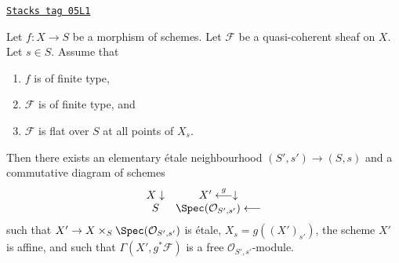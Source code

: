 \begin{lemma}
\label{flat-lemma-finite-type-flat-along-fibre-free-variant}
\href{https://stacks.math.columbia.edu/tag/05L1}{\texttt{Stacks tag 05L1}}

Let $f : X \to S$ be a morphism of schemes.
Let $\mathcal{F}$ be a quasi-coherent sheaf on $X$.
Let $s \in S$.
Assume that
\begin{enumerate}
\item $f$ is of finite type,
\item $\mathcal{F}$ is of finite type, and
\item $\mathcal{F}$ is flat over $S$ at all points of $X_s$.
\end{enumerate}
Then there exists an elementary \'etale neighbourhood $(S', s') \to (S, s)$
and a commutative diagram of schemes
$$
\begin{array}{cc}X \downarrow & X' \overset{g}{\longleftarrow}\downarrow \\ S & \Spec(\mathcal{O}_{S', s'}) \longleftarrow\end{array}
$$
such that $X' \to X \times_S \Spec(\mathcal{O}_{S', s'})$
is \'etale, $X_s = g((X')_{s'})$, the scheme $X'$ is affine,
and such that $\Gamma(X', g^*\mathcal{F})$ is a free
$\mathcal{O}_{S', s'}$-module.
\end{lemma}

